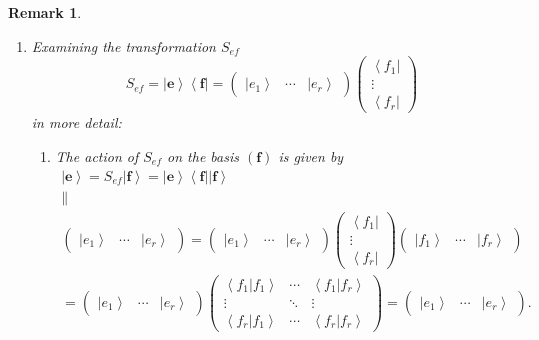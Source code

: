 \documentclass[aps,preprint]{revtex4}
\newtheorem{remark}[theorem]{Remark}
\begin{document}
\begin{remark}
\begin{enumerate}
\item Examining the transformation $S_{ef}$ 
\begin{equation}
S_{ef}=\left\vert \boldsymbol{e}\right\rangle \left\langle \boldsymbol{f}%
\right\vert =\left( 
\begin{array}{ccc}
\left\vert e_{1}\right\rangle & \cdots & \left\vert e_{r}\right\rangle%
\end{array}%
\right) \left( 
\begin{array}{c}
\left\langle f_{1}\right\vert \\ 
\vdots \\ 
\left\langle f_{r}\right\vert%
\end{array}%
\right)
\end{equation}%
in more detail:

\begin{enumerate}
\item The action of $S_{ef}$ on the basis $\left( \boldsymbol{f}\right) $ is
given by 
\begin{gather}
\left\vert \boldsymbol{e}\right\rangle =S_{ef}\left\vert \boldsymbol{f}%
\right\rangle =\left\vert \boldsymbol{e}\right\rangle \left\langle 
\boldsymbol{f}\right\vert \left\vert \boldsymbol{f}\right\rangle \\
\parallel \\
\left( 
\begin{array}{ccc}
\left\vert e_{1}\right\rangle & \cdots & \left\vert e_{r}\right\rangle%
\end{array}%
\right) =\left( 
\begin{array}{ccc}
\left\vert e_{1}\right\rangle & \cdots & \left\vert e_{r}\right\rangle%
\end{array}%
\right) \left( 
\begin{array}{c}
\left\langle f_{1}\right\vert \\ 
\vdots \\ 
\left\langle f_{r}\right\vert%
\end{array}%
\right) \left( 
\begin{array}{ccc}
\left\vert f_{1}\right\rangle & \cdots & \left\vert f_{r}\right\rangle%
\end{array}%
\right) \\
=\left( 
\begin{array}{ccc}
\left\vert e_{1}\right\rangle & \cdots & \left\vert e_{r}\right\rangle%
\end{array}%
\right) \left( 
\begin{array}{ccc}
\left\langle \left. f_{1}\right\vert f_{1}\right\rangle & \cdots & 
\left\langle \left. f_{1}\right\vert f_{r}\right\rangle \\ 
\vdots & \ddots & \vdots \\ 
\left\langle \left. f_{r}\right\vert f_{1}\right\rangle & \cdots & 
\left\langle \left. f_{r}\right\vert f_{r}\right\rangle%
\end{array}%
\right) =\left( 
\begin{array}{ccc}
\left\vert e_{1}\right\rangle & \cdots & \left\vert e_{r}\right\rangle%
\end{array}%
\right) .
\end{gather}


\end{enumerate}
\end{enumerate}
\end{remark}
\end{document}
